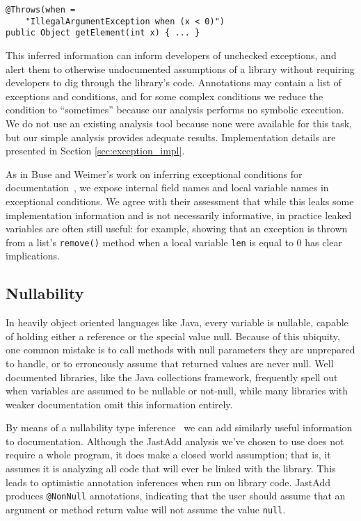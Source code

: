 \begin{verbatim}
@Throws(when =
    "IllegalArgumentException when (x < 0)")
public Object getElement(int x) { ... }
\end{verbatim}

This inferred information can inform developers of unchecked exceptions,
and alert them to otherwise undocumented assumptions of a library without
requiring developers to dig through the library's code.
Annotations may contain a list of exceptions and conditions, and for some
complex conditions we reduce the condition to ``sometimes'' because our analysis
performs no symbolic execution.  We do not use an
existing analysis tool because none were available for this task, but our
simple analysis provides adequate results.  Implementation details are presented
in Section \ref{sec:exception_impl}.

As in Buse and Weimer's work on inferring exceptional conditions for
documentation~\cite{autodoc}, we expose internal field names and
local variable names in exceptional conditions.  We agree with their assessment
that while this leaks some
implementation information and is not necessarily informative, in practice
leaked variables are often still useful: for example, showing that an exception is
thrown from a list's \texttt{remove()} method when a local variable \texttt{len}
is equal to 0 has clear implications.

\subsection{Nullability}
\label{sec:Nullability}

In heavily object oriented languages like Java, every variable is nullable,
capable of holding either a reference or the
special value null.  Because of this ubiquity, one common mistake is to call
methods with null parameters they are unprepared to handle, or to erroneously
assume that returned values are never null.  Well documented libraries, like
the Java collections framework, frequently spell out when variables are
assumed to be nullable or not-null, while many libraries with weaker
documentation omit this information entirely.

By means of a nullability type inference~\cite{NonNullTypeInference} we can add
similarly useful information to documentation.  Although the JastAdd analysis
we've chosen to use does not require a whole program, it does make a closed
world assumption; that is, it assumes it is analyzing all code that will ever be
linked with the library.  This leads to optimistic annotation inferences when run on
library code.  JastAdd produces \texttt{@NonNull} annotations, indicating that the user should assume that an
argument or method return value will not assume the value \texttt{null}.
